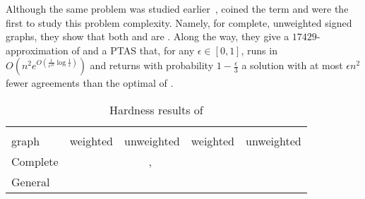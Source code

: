 Although the same problem was studied earlier~\autocites{Early96}{Ben-Dor99}, \textcite{Bansal2002}
coined the term \pcc{} and were the first to study this problem complexity. Namely, for complete,
unweighted signed graphs, they show that both \mind{} and \maxa{} are \NPc{}. Along the way, they
give a $17429$-approximation of \mind{} and a PTAS%
that, for any $\epsilon \in [0,1]$, runs in
$O(n^2e^{O(\frac{1}{\epsilon^{10}}\log\frac{1}{\epsilon})})$ and returns with probability
$1-\frac{\epsilon}{3}$ a solution with at most $\epsilon n^2$ fewer agreements than the optimal of
\maxa{}.

\begin{table}[bt]
   \centering
   \small
   \caption{Hardness results of \pcc{}} \label{tab:cc_cpx}
   \begin{tabulary}{187mm}{lCCCC}
      \toprule
               &    &                                    \\
      \cmidrule(r){2-3}
      \cmidrule(r){4-5}
      graph    & weighted                      & unweighted                                                     & weighted                                                     & unweighted                   \\
      \midrule
      Complete & \APXh{}~\autocite{Charikar2003} & \NPc{}~\autocite{Bansal2002}, \APXh{}~\autocite{Charikar2003}  &                                                              & \NPc{}~\autocite{Bansal2002} \\
      General  & \APXh{}~\autocites{Charikar2003}{Demaine2003} &  \APXh{}~\autocites{Charikar2003}{Emanuel2003}   &  \\
      \bottomrule
   \end{tabulary}
\end{table}


